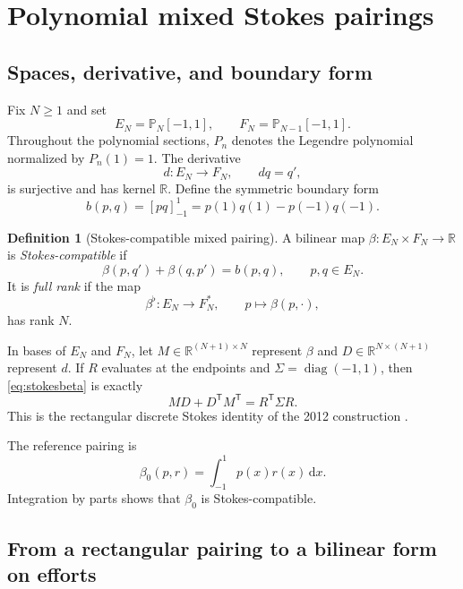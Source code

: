 \documentclass[11pt,a4paper]{article}
\theoremstyle{definition}
\newtheorem{definition}[theorem]{Definition}
\theoremstyle{remark}
\newcommand{\R}{\mathbb{R}}
\newcommand{\Pp}{\mathbb{P}}
\newcommand{\diag}{\operatorname{diag}}
\newcommand{\dd}{\,\mathrm{d}}
\newcommand{\bracket}[1]{\left[#1\right]_{-1}^{1}}
\begin{document}
\section{Polynomial mixed Stokes pairings}

\subsection{Spaces, derivative, and boundary form}

Fix $N\geq1$ and set
\[
 E_N=\Pp_N[-1,1],\qquad F_N=\Pp_{N-1}[-1,1].
\]
Throughout the polynomial sections, $P_n$ denotes the Legendre polynomial normalized by
$P_n(1)=1$.
The derivative
\[
 d:E_N\longrightarrow F_N,\qquad d q=q',
\]
is surjective and has kernel $\R$.  Define the symmetric boundary form
\begin{equation}\label{eq:boundaryform}
 b(p,q)=\bracket{pq}=p(1)q(1)-p(-1)q(-1).
\end{equation}

\begin{definition}[Stokes-compatible mixed pairing]
A bilinear map $\beta:E_N\times F_N\to\R$ is \emph{Stokes-compatible} if
\begin{equation}\label{eq:stokesbeta}
 \beta(p,q')+\beta(q,p')=b(p,q),
 \qquad p,q\in E_N.
\end{equation}
It is \emph{full rank} if the map
\[
 \beta^\flat:E_N\to F_N^*,\qquad
 p\mapsto\beta(p,\cdot),
\]
has rank $N$.
\end{definition}

In bases of $E_N$ and $F_N$, let $M\in\R^{(N+1)\times N}$ represent $\beta$ and
$D\in\R^{N\times(N+1)}$ represent $d$.  If $R$ evaluates at the endpoints and
$\Sigma=\diag(-1,1)$, then \eqref{eq:stokesbeta} is exactly
\begin{equation}\label{eq:matrixstokes}
 MD+D^{\mathsf T}M^{\mathsf T}=R^{\mathsf T}\Sigma R.
\end{equation}
This is the rectangular discrete Stokes identity of the 2012 construction
\cite{moulla2012}.

The reference pairing is
\begin{equation}\label{eq:l2pairing}
 \beta_0(p,r)=\int_{-1}^{1}p(x)r(x)\dd x.
\end{equation}
Integration by parts shows that $\beta_0$ is Stokes-compatible.

\subsection{From a rectangular pairing to a bilinear form on efforts}
\end{document}
